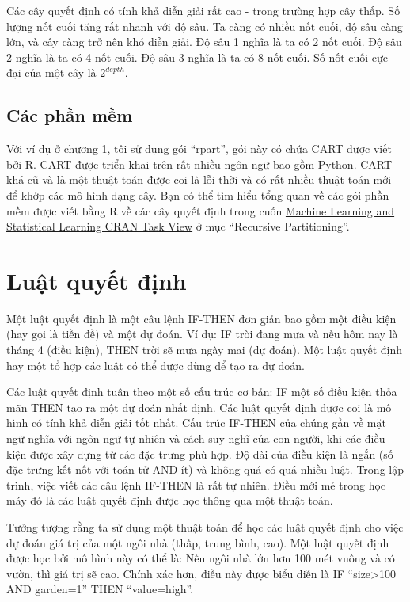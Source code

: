 Các cây quyết định có tính khả diễn giải rất cao - trong trường hợp cây thấp. Số lượng nốt cuối tăng rất nhanh với độ sâu. Ta càng có nhiều nốt cuối, độ sâu càng lớn, và cây càng trở nên khó diễn giải. Độ sâu 1 nghĩa là ta có 2 nốt cuối. Độ sâu 2 nghĩa là ta có 4 nốt cuối. Độ sâu 3 nghĩa là ta có 8 nốt cuối. Số nốt cuối cực đại của một cây là $2^{depth}$.

\subsection{Các phần mềm}
Với ví dụ ở chương 1, tôi sử dụng gói ``rpart'', gói này có chứa CART được viết bởi R. CART được triển khai trên rất nhiều ngôn ngữ bao gồm Python. CART khá cũ và là một thuật toán được coi là lỗi thời và có rất nhiều thuật toán mới để khớp các mô hình dạng cây. Bạn có thể tìm hiểu tổng quan về các gói phần mềm được viết bằng R về các cây quyết định trong cuốn \href{https://cran.r-project.org/web/views/MachineLearning.html}{Machine Learning and Statistical Learning CRAN Task View} ở mục ``Recursive Partitioning''.
\clearpage
\section{Luật quyết định}

Một luật quyết định là một câu lệnh IF-THEN đơn giản bao gồm một điều kiện (hay gọi là tiền đề) và một dự đoán. Ví dụ: IF trời đang mưa và nếu hôm nay là tháng 4 (điều kiện), THEN trời sẽ mưa ngày mai (dự đoán). Một luật quyết định hay một tổ hợp các luật có thể được dùng để tạo ra dự đoán.

Các luật quyết định tuân theo một số cấu trúc cơ bản: IF một số điều kiện thỏa mãn THEN tạo ra một dự đoán nhất định. Các luật quyết định được coi là mô hình có tính khả diễn giải tốt nhất. Cấu trúc IF-THEN của chúng gần về mặt ngữ nghĩa với ngôn ngữ tự nhiên và cách suy nghĩ của con người, khi các điều kiện được xây dựng từ các đặc trưng phù hợp. Độ dài của điều kiện là ngắn (số đặc trưng kết nốt với toán tử AND ít) và không quá có quá nhiều luật. Trong lập trình, việc viết các câu lệnh IF-THEN là rất tự nhiên. Điều mới mẻ trong học máy đó là các luật quyết định được học thông qua một thuật toán.

Tưởng tượng rằng ta sử dụng một thuật toán để học các luật quyết định cho việc dự đoán giá trị của một ngôi nhà (thấp, trung bình, cao). Một luật quyết định được học bởi mô hình này có thể là: Nếu ngôi nhà lớn hơn 100 mét vuông và có vườn, thì giá trị sẽ cao. Chính xác hơn, điều này được biểu diễn là IF ``size>100 AND garden=1'' THEN ``value=high''.

